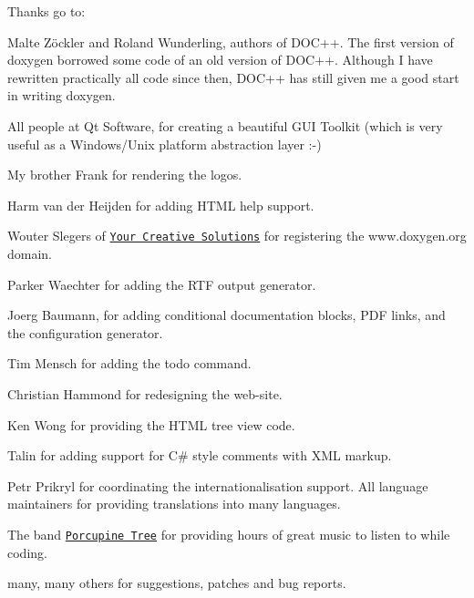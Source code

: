  Thanks go to: 
\begin{DoxyItemize}
\item {} Malte Z\"{o}ckler and Roland Wunderling, authors of DOC++. The first version of doxygen borrowed some code of an old version of DOC++. Although I have rewritten practically all code since then, DOC++ has still given me a good start in writing doxygen. 
\item All people at Qt Software, for creating a beautiful GUI Toolkit (which is very useful as a Windows/Unix platform abstraction layer :-\/) 
\item My brother Frank for rendering the logos. 
\item Harm van der Heijden for adding HTML help support. 
\item Wouter Slegers of \href{http://www.yourcreativesolutions.nl}{\tt Your Creative Solutions} for registering the www.doxygen.org domain. 
\item Parker Waechter for adding the RTF output generator. 
\item Joerg Baumann, for adding conditional documentation blocks, PDF links, and the configuration generator. 
\item Tim Mensch for adding the todo command. 
\item Christian Hammond for redesigning the web-\/site. 
\item Ken Wong for providing the HTML tree view code. 
\item Talin for adding support for C\# style comments with XML markup. 
\item Petr Prikryl for coordinating the internationalisation support. All language maintainers for providing translations into many languages. 
\item The band \href{http://www.porcupinetree.com}{\tt Porcupine Tree} for providing hours of great music to listen to while coding. 
\item many, many others for suggestions, patches and bug reports. 
\end{DoxyItemize}